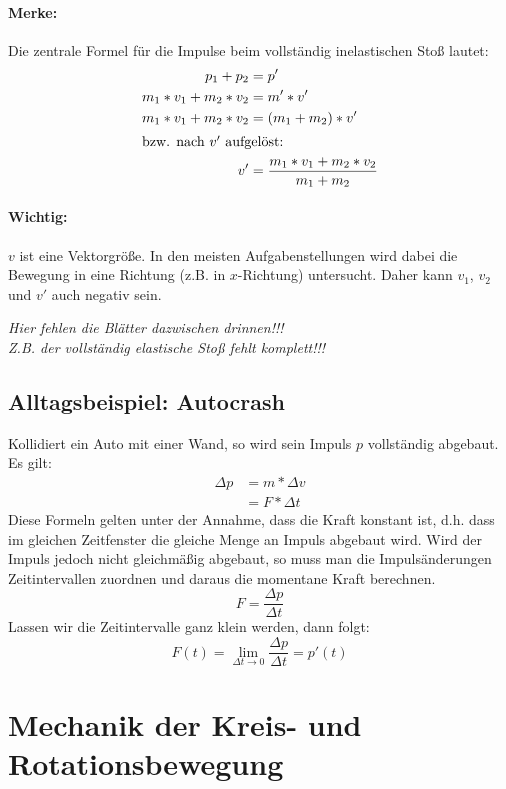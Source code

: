 \documentclass[12pt]{article}
\numberwithin{equation}{subsection}
\begin{document}
	\paragraph{Merke:}
	Die zentrale Formel für die Impulse beim vollständig inelastischen Stoß lautet:
	\begin{align}
		p_1 + p_2 &= p'\\
		m_1*v_1+m_2*v_2 &= m'*v'\\
		m_1*v_1+m_2*v_2 &= (m_1+m_2)*v'\\
		\shortintertext{bzw. nach $ v' $ aufgelöst:}
		v' &= \dfrac{m_1*v_1+m_2*v_2}{m_1+m_2}
	\end{align}
	\paragraph{Wichtig:}
	$ v $ ist eine Vektorgröße. In den meisten Aufgabenstellungen wird dabei die Bewegung in eine Richtung (z.B. in $ x $-Richtung) untersucht. Daher kann $ v_1 $, $ v_2 $ und $ v' $ auch negativ sein.
	
	\emph{Hier fehlen die Blätter dazwischen drinnen!!!}\\
	\emph{Z.B. der vollständig elastische Stoß fehlt komplett!!!}
	
	\subsection{Alltagsbeispiel: Autocrash}
	Kollidiert ein Auto mit einer Wand, so wird sein Impuls $ p $ vollständig abgebaut. Es gilt:
	\begin{align}
		\Delta p &= m*\Delta v\\
		&= F*\Delta t
	\end{align}
	Diese Formeln gelten unter der Annahme, dass die Kraft konstant ist, d.h. dass im gleichen Zeitfenster die gleiche Menge an Impuls abgebaut wird. Wird der Impuls jedoch nicht gleichmäßig abgebaut, so muss man die Impulsänderungen Zeitintervallen zuordnen und daraus die momentane Kraft berechnen.
	\begin{equation}
		F = \dfrac{\Delta p}{\Delta t}
	\end{equation}
	Lassen wir die Zeitintervalle ganz klein werden, dann folgt:
	\begin{equation}
		F(t) = \lim\limits_{\Delta t\to 0}\dfrac{\Delta p}{\Delta t} = p'(t)
	\end{equation}
	
	\section{Mechanik der Kreis- und Rotationsbewegung}
\end{document}
